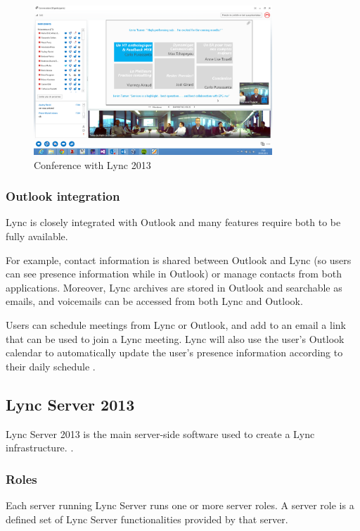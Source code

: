 \begin{figure}[h!]
	\centering
	\includegraphics[width=0.8\textwidth]{Schemas/lync.png}
	\caption{Conference with Lync 2013}
	\label{fig:lync_conferencing}
\end{figure}

\subsubsection{Outlook integration}
Lync is closely integrated with Outlook and many features require both to be fully available.

For example, contact information is shared between Outlook and Lync (so users can see presence information while in Outlook) or manage contacts from both applications. Moreover, Lync archives are stored in Outlook and searchable as emails, and voicemails can be accessed from both Lync and Outlook.

Users can schedule meetings from Lync or Outlook, and add to an email a link that can be used to join a Lync meeting. Lync will also use the user's Outlook calendar to automatically update the user's presence information according to their daily schedule
\cite{winters_mastering_2012}.


\subsection{Lync Server 2013}

Lync Server 2013 is the main server-side software used to create a Lync infrastructure\cite[Ch. 1.2]{microsoft_technet_lync_2013-2,winters_mastering_2012}.
.

\subsubsection{Roles}
Each server running Lync Server runs one or more server roles. A server role is a defined set of Lync Server functionalities provided by that server.


